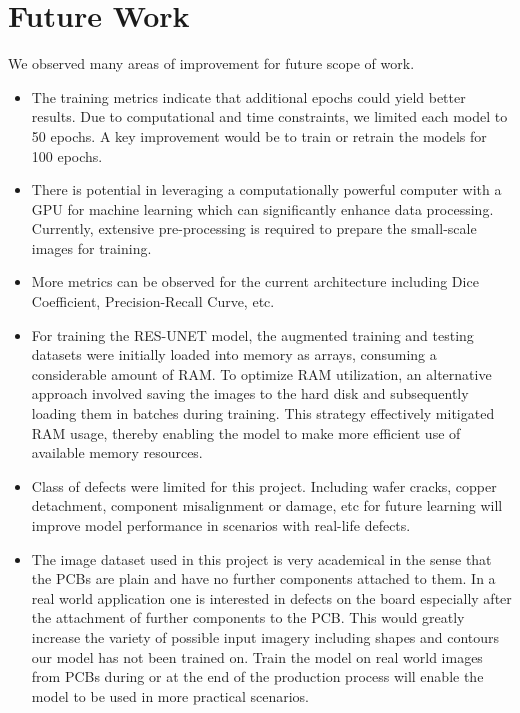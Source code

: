 \documentclass[12pt]{article}
\begin{document}
\clearpage
\newpage

\section{Future Work}
We observed many areas of improvement for future scope of work. 
\begin{itemize}
    \item The training metrics indicate that additional epochs could yield better results. Due to computational and time constraints, we limited each model to 50 epochs. A key improvement would be to train or retrain the models for 100 epochs.
    \item There is potential in leveraging a computationally powerful computer with a GPU for machine learning which can significantly enhance data processing. Currently, extensive pre-processing is required to prepare the small-scale images for training.
    \item More metrics can be observed for the current architecture including Dice Coefficient, Precision-Recall Curve, etc.  
    \item For training the RES-UNET model, the augmented training and testing datasets were initially loaded into memory as arrays, consuming a considerable amount of RAM. To optimize RAM utilization, an alternative approach involved saving the images to the hard disk and subsequently loading them in batches during training. This strategy effectively mitigated RAM usage, thereby enabling the model to make more efficient use of available memory resources.
    \item Class of defects were limited for this project. Including wafer cracks, copper detachment, component misalignment or damage, etc for future learning will improve model performance in scenarios with real-life defects.
    \item The image dataset used in this project is very academical in the sense that the PCBs are plain and have no further components attached to them. In a real world application one is interested in defects on the board especially after the attachment of further components to the PCB. This would greatly increase the variety of possible input imagery including shapes and contours our model has not been trained on. Train the model on real world images from PCBs during or at the end of the production process will enable the model to be used in more practical scenarios.

\end{itemize}
\end{document}
